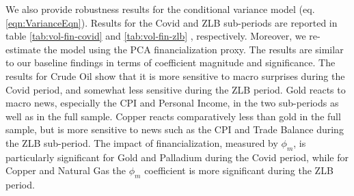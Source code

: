 We also provide robustness results for the conditional variance model (eq. \ref{eqn:VarianceEqn}).  Results for the Covid and ZLB sub-periods are reported in table \ref{tab:vol-fin-covid} and  \ref{tab:vol-fin-zlb} , respectively. Moreover, we re-estimate the model using the PCA financialization proxy.  The results are similar to our baseline findings in terms of coefficient magnitude and significance. 
The results for Crude Oil show that it is more sensitive to macro surprises during the Covid period, and somewhat less sensitive during the ZLB period.
Gold reacts to macro news, especially the CPI and Personal Income, in the two sub-periods as well as in the full sample. Copper reacts comparatively less than gold in the full sample, but is more sensitive to news such as the CPI and Trade Balance during the ZLB sub-period.
The impact of financialization, measured by $\phi_m$, is particularly significant for Gold and Palladium during the Covid period, while for Copper and Natural Gas the $\phi_m$ coefficient is more significant during the ZLB period. %
